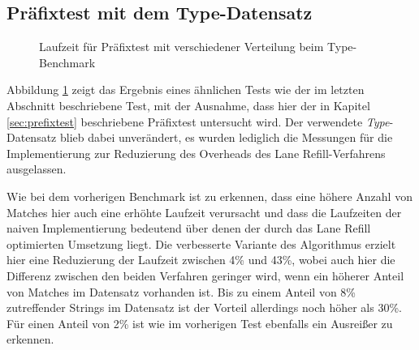 \subsection{Präfixtest mit dem Type-Datensatz}

\begin{figure}[ht]
	\centering
	\caption{Laufzeit für Präfixtest mit verschiedener Verteilung beim Type-Benchmark}
\label{fig:type_prefix}
\end{figure}

Abbildung \ref{fig:type_prefix} zeigt das Ergebnis eines ähnlichen Tests wie der im letzten Abschnitt beschriebene Test, mit der Ausnahme, dass hier der in Kapitel \ref{sec:prefixtest} beschriebene Präfixtest untersucht wird.
Der verwendete \emph{Type}-Datensatz blieb dabei unverändert, es wurden lediglich die Messungen für die Implementierung zur Reduzierung des Overheads des Lane Refill-Verfahrens ausgelassen.

Wie bei dem vorherigen Benchmark ist zu erkennen, dass eine höhere Anzahl von Matches hier auch eine erhöhte Laufzeit verursacht und dass die Laufzeiten der naiven Implementierung bedeutend über denen der durch das Lane Refill optimierten Umsetzung liegt.
Die verbesserte Variante des Algorithmus erzielt hier eine Reduzierung der Laufzeit zwischen 4\% und 43\%, wobei auch hier die Differenz zwischen den beiden Verfahren geringer wird, wenn ein höherer Anteil von Matches im Datensatz vorhanden ist.
Bis zu einem Anteil von 8\% zutreffender Strings im Datensatz ist der Vorteil allerdings noch höher als 30\%.
Für einen Anteil von 2\% ist wie im vorherigen Test ebenfalls ein Ausreißer zu erkennen.


